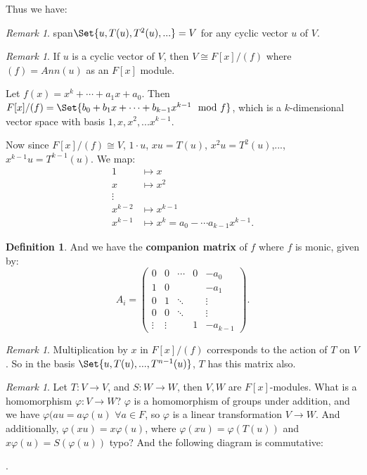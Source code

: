 \documentclass[9pt,reqno,twoside]{amsbook}
\theoremstyle{plain}
\numberwithin{section}{chapter}
\numberwithin{equation}{chapter}
\theoremstyle{definition}
\newtheorem{Def}[theorem]{Definition}
\theoremstyle{remark}
\newtheorem{rem}[theorem]{Remark}
\theoremstyle{plain}
\newcommand{\bee}{\begin{equation}\begin{aligned}}
\newcommand{\eee}{\end{aligned}\end{equation}}
\newcommand{\lpar}{\left(}
\newcommand{\rpar}{\right)}
\renewcommand{\phi}{\varphi}
\begin{document}
Thus we have:

\begin{rem}
span$\Set{u,T(u),T^2(u),...} = V$ for any cyclic vector $u$ of $V$. 
\end{rem}

\begin{rem}
If $u$ is a cyclic vector of $V$, then $V \cong F[x]/(f)$ where $(f) = Ann(u)$ as an $F[x]$ module. 
\end{rem}


Let $f(x) = x^k + \cdots + a_1x + a_0$. Then $F[x]/(f) = \Set{b_0 + b_1x + \cdots + b_{k -1}x^{k - 1} \mod f}$, which is a $k$-dimensional vector space with basis $1,x,x^2,...x^{k - 1}$. 

Now since $F[x]/(f) \cong V$, $1 \cdot u$, $xu = T(u)$, $x^2u = T^2(u)$,...,$x^{k - 1}u = T^{k - 1}(u)$. We map:
\bee
1 &\mapsto x\\
x &\mapsto x^2\\
\vdots\\
x^{k - 2} &\mapsto x^{k - 1}\\
x^{k - 1} &\mapsto x^k = a_0 - \cdots a_{k - 1}x^{k - 1}.
\eee

\begin{Def}
And we have the \textbf{companion matrix} of $f$ where $f$ is monic, given by:
$$
A_i 
= \lpar 
\begin{array}{cccc|c}
0 & 0 & \cdots & 0 &-a_0\\
1 & 0 & & & -a_1\\
0 & 1 &\ddots & &\vdots\\
0 & 0 & \ddots & & \vdots\\
\vdots & \vdots & & 1 & -a_{k - 1}
\end{array} \rpar. 
$$
\end{Def}

\begin{rem}
Multiplication by $x$ in $F[x]/(f)$ corresponds to the action of $T$ on $V$. So in the basis $\Set{u,T(u),...,T^{n - 1}(u)}$, $T$ has this matrix also. 
\end{rem}

\begin{rem}
Let $T: V \to V$, and $S:W \to W$, then $V,W$ are $F[x]$-modules. What is a homomorphism $\phi:V \to W$? $\phi$ is a homomorphism of groups under addition, and we have $\phi(au = a\phi(u)$ $\forall a \in F$, so $\phi$ is a linear transformation $V \to W$. And additionally, $\phi(xu) = x\phi(u)$, where $\phi(xu) = \phi(T(u))$ and $x\phi(u) = S(\phi(u))$ typo? And the following diagram is commutative: 

\begin{center}
.
\end{center}
\end{rem}
\end{document}
